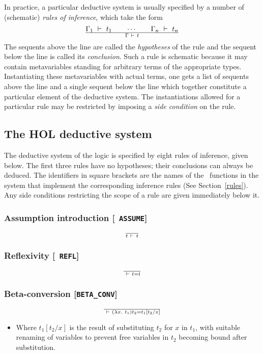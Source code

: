 In practice, a particular deductive system is usually specified by a
number of (schematic) \emph{rules of inference},
which take the form
\[
\Gamma_1\ \vdash\  t_1 \qquad\cdots\qquad\Gamma_n\ \vdash\  t_n
\over
\Gamma \ \vdash\  t
\]
The sequents above the line are called the {\it
hypotheses\/} of the rule and the
sequent below the line is called its {\it
conclusion}. Such a rule is
schematic because it may contain metavariables
standing for arbitrary terms of the appropriate types. Instantiating
these metavariables with actual terms, one gets a list of sequents
above the line and a single sequent below the line which together
constitute a particular element of the deductive system. The
instantiations allowed for a particular rule may be restricted by
imposing a {\em side condition\/} on the rule.


\subsection{The HOL deductive system}
\label{HOLrules}

The deductive system of the \HOL{} logic is specified by eight
rules of inference, given below.  The first three rules
have no hypotheses; their conclusions can always be deduced. The
identifiers in square brackets are the names of the \ML\ functions in
the \HOL{} system that implement the corresponding inference rules (See
Section~\ref{rules}). Any side conditions restricting the scope of a
rule are given immediately below it.

\bigskip

\subsubsection*{Assumption introduction [{\small\tt
ASSUME}]}
\[
\over t
\ \vdash\  t
\]

\subsubsection*{Reflexivity [{\small\tt
REFL}]}
\[
\over
\ \vdash\  t = t
\]

\subsubsection*{Beta-conversion [{\small\tt BETA\_CONV}]}
\[
\over
\ \vdash\  (\lambda x.\ t_1)t_2 = t_1[t_2/x]
\]
\begin{itemize}
\item Where $t_1[t_2/x]$ is
the result of substituting $t_2$ for $x$
in $t_1$, with suitable renaming of variables to prevent free variables
in $t_2$ becoming bound after substitution.
\end{itemize}

